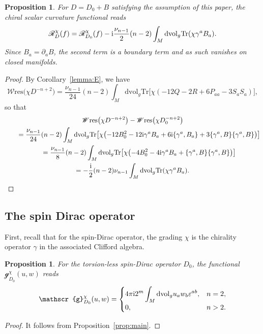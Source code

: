 \documentclass[pdftex]{sigma}
\numberwithin{equation}{section}
\newtheorem{Proposition}[Theorem]{Proposition}
\theoremstyle{definition}
\def\W{\mathscr{W} \mathrm{res}}
\def\Tr{\mathrm{Tr}}
\def\dv{\mathrm{dvol}_g}
\begin{document}
\begin{Proposition}
	\label{prop:EHchi}
 For $D = D_0+B$ satisfying the assumption of this paper, the chiral scalar curvature functional reads
 \[
 \mathscr{R}^\chi_D(f)=\mathscr{R}^\chi_{D_0}(f)- {\rm i} \frac{\nu_{n-1}}{2}(n-2) \int_M \dv \Tr (\chi \gamma^a B_a).
 \]
 Since $B_a=\partial_a B$, the second term is a boundary term and as such vanishes on closed manifolds.
\end{Proposition}
\begin{proof}
By Corollary~\ref{lemma:E}, we have
\[
 \W\bigl(\chi D^{-n+2}\bigr)=\frac{\nu_{n-1}}{24}(n-2)\int_M \dv \Tr \bigl[\chi(-12Q -2R +6P_{aa}-3S_aS_a)\bigr],
\]
so that
\begin{gather*}
 \W\bigl(\chi D^{-n+2}\bigr)-\W\bigl(\chi D_0^{-n+2}\bigr)\\
\qquad =\frac{\nu_{n-1}}{24}(n-2)\int_M \dv \Tr \bigl[\chi\bigl(-12 B_0^2-12{\rm i}\gamma^a B_a +6{\rm i}\{\gamma^a, B_a\}+3\{\gamma^a, B\}\{\gamma^a, B\}\bigr)\bigr]\\
\qquad=\frac{\nu_{n-1}}{8}(n-2)\int_M \dv \Tr \bigl[\chi\bigl(-4B_0^2 -4{\rm i} \gamma^a B_a +\{\gamma^a, B\}\{\gamma^a, B\}\bigr)\bigr]\\
 \qquad=-\frac{\rm i}{2}(n-2)\nu_{n-1}\int_M\dv \Tr(\chi \gamma^a B_a).\tag*{\qed}
\end{gather*} \renewcommand{\qed}{}
\end{proof}

\subsection{The spin Dirac operator}
First, recall that for the spin-Dirac operator, the grading $\chi$ is the chirality operator $\gamma$ in the associated Clifford algebra.
\begin{Proposition}\label{ch-g-spin}
	For the torsion-less spin-Dirac operator $D_0$, the functional $\mathscr{g}_{D_0}^\chi(u,w)$ reads
 \[
 \mathscr{g}_{D_0}^\chi(u,w)=
 \begin{cases}
 \displaystyle 4\pi {\rm i}{2^m}\int_M\dv u_a w_b \varepsilon^{ab}, & n=2,\\
 0, & n>2.
 \end{cases}
 \]
\end{Proposition}

\begin{proof}
 It follows from Proposition~\ref{prop:main}.
\end{proof}
\end{document}
